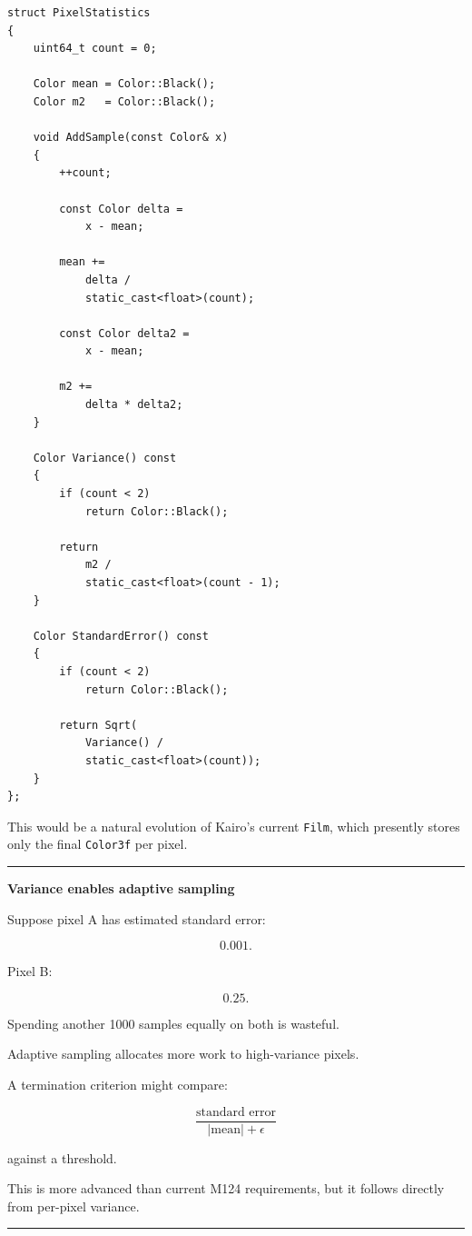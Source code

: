 \begin{verbatim}
struct PixelStatistics
{
    uint64_t count = 0;

    Color mean = Color::Black();
    Color m2   = Color::Black();

    void AddSample(const Color& x)
    {
        ++count;

        const Color delta =
            x - mean;

        mean +=
            delta /
            static_cast<float>(count);

        const Color delta2 =
            x - mean;

        m2 +=
            delta * delta2;
    }

    Color Variance() const
    {
        if (count < 2)
            return Color::Black();

        return
            m2 /
            static_cast<float>(count - 1);
    }

    Color StandardError() const
    {
        if (count < 2)
            return Color::Black();

        return Sqrt(
            Variance() /
            static_cast<float>(count));
    }
};
\end{verbatim}

This would be a natural evolution of Kairo's current \texttt{Film}, which presently stores only the final \texttt{Color3f} per pixel.

\begin{center}\rule{0.5\linewidth}{0.5pt}\end{center}

\textbf{Variance enables adaptive sampling}

Suppose pixel A has estimated standard error:

\[
0.001.
\]

Pixel B:

\[
0.25.
\]

Spending another 1000 samples equally on both is wasteful.

Adaptive sampling allocates more work to high-variance pixels.

A termination criterion might compare:

\[
\frac{
\text{standard error}
}{
|\text{mean}|+\epsilon
}
\]

against a threshold.

This is more advanced than current M124 requirements, but it follows directly from per-pixel variance.

\begin{center}\rule{0.5\linewidth}{0.5pt}\end{center}

